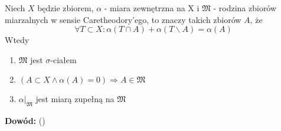 \begin{tw}
	Niech $X$ będzie zbiorem, $\alpha$ - miara zewnętrzna na X i $\mathfrak{M}$ - rodzina zbiorów miarzalnych w sensie Caretheodory'ego, to znaczy takich zbiorów $A$, że 
	$$
	\forall T \subset X: \alpha(T \cap A)  + \alpha(T \backslash A) = \alpha(A)
	$$
	Wtedy 
	\begin{enumerate}	
		\item $\mathfrak{M}$ jest $\sigma$-ciałem
		\item $(A \subset X \wedge \alpha(A) = 0) \Longrightarrow A \in \mathfrak{M}$ 
		\item $\alpha|_{\mathfrak{M}}$ jest miarą zupełną na $\mathfrak{M}$ 
	\end{enumerate}
	\textbf{Dowód:} (\citep[3.30]{Tworzewski}) 
\end{tw}